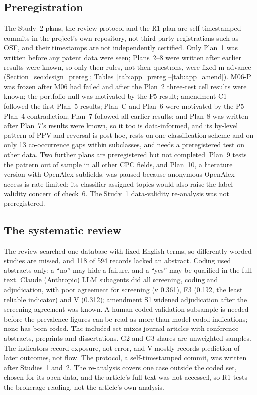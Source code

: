 \subsection{Preregistration}
\label{sec:lim_prereg}

The Study~2 plans, the review protocol and the R1 plan are self-timestamped commits in the project's own repository, not third-party registrations such as OSF, and their timestamps are not independently certified. Only Plan~1 was written before any patent data were seen; Plans~2--8 were written after earlier results were known, so only their rules, not their questions, were fixed in advance (Section~\ref{sec:design_prereg}; Tables~\ref{tab:app_prereg}--\ref{tab:app_amend}). M06-P was frozen after M06 had failed and after the Plan~2 three-test cell results were known; the portfolio null was motivated by the P5 result; amendment C1 followed the first Plan~5 results; Plan~C and Plan~6 were motivated by the P5--Plan~4 contradiction; Plan~7 followed all earlier results; and Plan~8 was written after Plan~7's results were known, so it too is data-informed, and its by-level pattern of PPV and reversal is post hoc, rests on one classification scheme and on only 13 co-occurrence gaps within subclasses, and needs a preregistered test on other data. Two further plans are preregistered but not completed: Plan~9 tests the pattern out of sample in all other CPC fields, and Plan~10, a literature version with OpenAlex subfields, was paused because anonymous OpenAlex access is rate-limited; its classifier-assigned topics would also raise the label-validity concern of check~6. The Study~1 data-validity re-analysis was not preregistered.

\subsection{The systematic review}
\label{sec:lim_review}

The review searched one database with fixed English terms, so differently worded studies are missed, and 118 of 594 records lacked an abstract. Coding used abstracts only: a ``no'' may hide a failure, and a ``yes'' may be qualified in the full text. Claude (Anthropic) LLM subagents did all screening, coding and adjudication, with poor agreement for screening ($\kappa$ 0.361), F3 (0.192, the least reliable indicator) and V (0.312); amendment S1 widened adjudication after the screening agreement was known. A human-coded validation subsample is needed before the prevalence figures can be read as more than model-coded indications; none has been coded. The included set mixes journal articles with conference abstracts, preprints and dissertations. G2 and G3 shares are unweighted samples. The indicators record exposure, not error, and V mostly records prediction of later outcomes, not flow. The protocol, a self-timestamped commit, was written after Studies~1 and~2. The re-analysis covers one case outside the coded set, chosen for its open data, and the article's full text was not accessed, so R1 tests the brokerage reading, not the article's own analysis.

